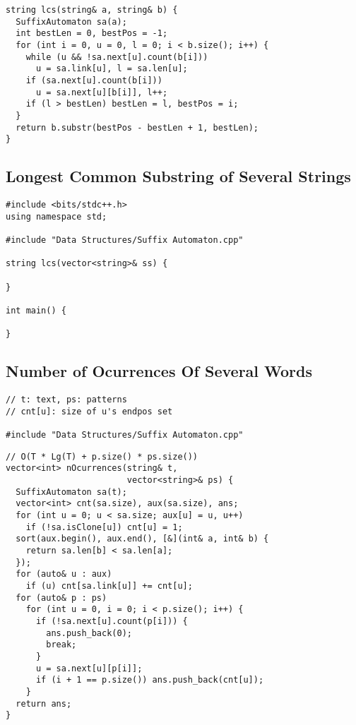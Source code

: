 \documentclass[twoside]{article}
\newcommand{\fileTitleStyle}{\large\underline}
\begin{document}
\begin{multicols*}{2}
\begin{verbatim}
string lcs(string& a, string& b) {
  SuffixAutomaton sa(a);
  int bestLen = 0, bestPos = -1;
  for (int i = 0, u = 0, l = 0; i < b.size(); i++) {
    while (u && !sa.next[u].count(b[i]))
      u = sa.link[u], l = sa.len[u];
    if (sa.next[u].count(b[i]))
      u = sa.next[u][b[i]], l++;
    if (l > bestLen) bestLen = l, bestPos = i;
  }
  return b.substr(bestPos - bestLen + 1, bestLen);
}
\end{verbatim}

\subsectionfont{\centering\bfseries\LARGE}
\subsectionfont{\fileTitleStyle}
\subsection*{Longest Common Substring of Several Strings}
\begin{verbatim}
#include <bits/stdc++.h>
using namespace std;

#include "Data Structures/Suffix Automaton.cpp"

string lcs(vector<string>& ss) {
  
}

int main() {

}
\end{verbatim}

\subsectionfont{\centering\bfseries\LARGE}
\subsectionfont{\fileTitleStyle}
\subsection*{Number of Ocurrences Of Several Words}
\begin{verbatim}
// t: text, ps: patterns
// cnt[u]: size of u's endpos set

#include "Data Structures/Suffix Automaton.cpp"
\end{verbatim}
\vspace{-12pt}
\begin{verbatim}
// O(T * Lg(T) + p.size() * ps.size())
vector<int> nOcurrences(string& t,
                        vector<string>& ps) {
  SuffixAutomaton sa(t);
  vector<int> cnt(sa.size), aux(sa.size), ans;
  for (int u = 0; u < sa.size; aux[u] = u, u++)
    if (!sa.isClone[u]) cnt[u] = 1;
  sort(aux.begin(), aux.end(), [&](int& a, int& b) {
    return sa.len[b] < sa.len[a];
  });
  for (auto& u : aux)
    if (u) cnt[sa.link[u]] += cnt[u];
  for (auto& p : ps)
    for (int u = 0, i = 0; i < p.size(); i++) {
      if (!sa.next[u].count(p[i])) {
        ans.push_back(0);
        break;
      }
      u = sa.next[u][p[i]];
      if (i + 1 == p.size()) ans.push_back(cnt[u]);
    }
  return ans;
}
\end{verbatim}


\end{multicols*}
\end{document}
